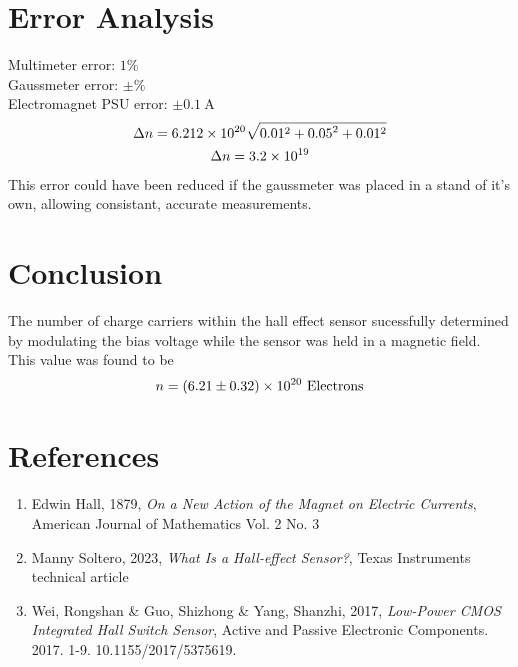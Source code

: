 \documentclass{article}
\begin{document}
    \section{Error Analysis}
        Multimeter error: $1\%$ \\
        Gaussmeter error: $\pm \%$ \\
        Electromagnet PSU error: $\pm \qty{0.1}{\A}$ \\
        \begin{gather*}
            \Delta n = \num{6.212E20} \sqrt{0.01^2 + {\num{0.05}}^2 + 0.01^2} \\
            \Delta n = \num{3.2E19}
        \end{gather*}
        This error could have been reduced if the gaussmeter was placed in a stand of it's own, allowing consistant, accurate measurements. 
    \section{Conclusion}
        The number of charge carriers within the hall effect sensor sucessfully determined by modulating the bias voltage while the sensor was held in a magnetic field. This value was found to be
            \[n = \num{6.21(0.32)E20}\text{ Electrons}\]
    \section{References}
        \begin{enumerate}
            \item Edwin Hall, 1879, \emph{On a New Action of the Magnet on Electric Currents}, American Journal of Mathematics Vol. 2 No. 3
            \item Manny Soltero, 2023, \emph{What Is a Hall-effect Sensor?}, Texas Instruments technical article
            \item Wei, Rongshan \& Guo, Shizhong \& Yang, Shanzhi, 2017, \emph{Low-Power CMOS Integrated Hall Switch Sensor}, Active and Passive Electronic Components. 2017. 1-9. 10.1155/2017/5375619. 
        \end{enumerate}
\end{document}
